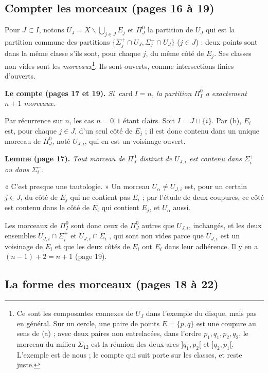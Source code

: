 \documentclass[11pt,a4paper]{article}
\begin{document}
\subsection*{Compter les morceaux (pages 16 à 19)}

Pour $J \subset I$, notons $U_J = X \smallsetminus \bigcup_{j \in J} E_j$ et
$\Pi_J^0$ la partition de $U_J$ qui est la partition commune des partitions
$\{\Sigma_j^{+} \cap U_J, \Sigma_j^{-} \cap U_J\}$ ($j \in J$) : deux points
sont dans la même classe s'ils sont, pour chaque $j$, du même côté de $E_j$.
Ses classes non vides sont les \emph{morceaux}\footnote{Ce sont les
composantes connexes de $U_J$ dans l'exemple du disque, mais pas en général.
Sur un cercle, une paire de points $E = \{p, q\}$ est une coupure au sens de
(a) ; avec deux paires non entrelacées, dans l'ordre $p_1, q_1, p_2, q_2$, le
morceau du milieu $\Sigma_{12}$ est la réunion des deux arcs $]q_1, p_2[$ et
$]q_2, p_1[$. L'exemple est de nous ; le compte qui suit porte sur les
classes, et reste juste.}. Ils sont ouverts, comme intersections finies
d'ouverts.

\textbf{Le compte (pages 17 et 19).} \emph{Si $\operatorname{card} I = n$,
la partition $\Pi_I^0$ a exactement $n + 1$ morceaux.}

Par récurrence sur $n$, les cas $n = 0, 1$ étant clairs. Soit $I = J \sqcup
\{i\}$. Par (b), $E_i$ est, pour chaque $j \in J$, d'un seul côté de $E_j$ ;
il est donc contenu dans un unique morceau de $\Pi_J^0$, noté $U_{J,i}$, qui
en est un voisinage ouvert.

\textbf{Lemme (page 17).} \emph{Tout morceau de $\Pi_J^0$ distinct de
$U_{J,i}$ est contenu dans $\Sigma_i^{+}$ ou dans $\Sigma_i^{-}$.}

« C'est presque une tautologie. » Un morceau $U_\alpha \neq U_{J,i}$ est, pour
un certain $j \in J$, du côté de $E_j$ qui ne contient pas $E_i$ ; par
l'étude de deux coupures, ce côté est contenu dans le côté de $E_i$ qui
contient $E_j$, et $U_\alpha$ aussi.

Les morceaux de $\Pi_I^0$ sont donc ceux de $\Pi_J^0$ autres que $U_{J,i}$,
inchangés, et les deux ensembles $U_{J,i} \cap \Sigma_i^{+}$ et $U_{J,i} \cap
\Sigma_i^{-}$, qui sont non vides parce que $U_{J,i}$ est un voisinage de
$E_i$ et que les deux côtés de $E_i$ ont $E_i$ dans leur adhérence. Il y en
a $(n - 1) + 2 = n + 1$ (page 19).

\subsection*{La forme des morceaux (pages 18 à 22)}
\end{document}
